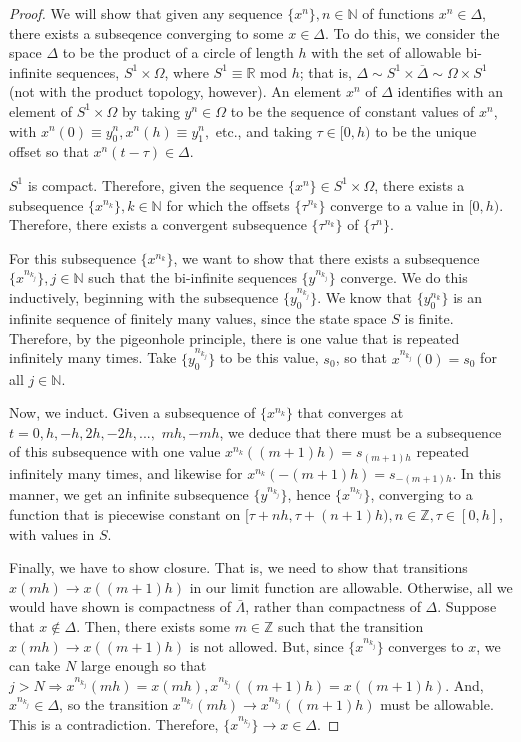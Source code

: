 \documentclass[11pt]{article}
\begin{document}
\begin{proof}
We will show that given any sequence $\{x^n\}, n \in \mathbb{N}$ of functions $x^n \in \Delta$, there exists a subseqence converging to some $x \in \Delta$.  To do this, we consider the space $\Delta$ to be the product of a circle of length $h$ with the set of allowable bi-infinite sequences, $S^1 \times \Omega$, where $S^1 \equiv \mathbb{R}$ mod $h$; that is, $\Delta \sim S^1\times\overline{\Delta} \sim \Omega\times S^1$ (not with the product topology, however).  An element $x^n$ of $\Delta$ identifies with an element of $S^1 \times \Omega$ by taking $y^n \in \Omega$ to be the sequence of constant values of $x^n$, with $x^n(0) \equiv y^n_0, x^n(h) \equiv y^n_1,$ etc., and taking $\tau \in [0,h)$ to be the unique offset so that $x^n(t-\tau) \in \Delta$.

$S^1$ is compact.  Therefore, given the sequence $\{x^n\} \in S^1 \times \Omega$, there exists a subsequence $\{x^{n_k}\}, k \in \mathbb{N}$ for which the offsets $\{\tau^{n_k}\}$ converge to a value in $[0,h)$.  Therefore, there exists a convergent subsequence $\{\tau^{n_k}\}$ of $\{\tau^n\}$.

For this subsequence $\{x^{n_k}\}$, we want to show that there exists a subsequence $\{x^{n_{k_j}}\}, j \in \mathbb{N}$ such that the bi-infinite sequences $\{y^{n_{k_j}}\}$ converge.  We do this inductively, beginning with the subsequence $\{y^{n_{k_j}}_0\}$.  We know that  $\{y^{n_k}_0\}$ is an infinite sequence of finitely many values, since the state space $S$ is finite.  Therefore, by the pigeonhole principle, there is one value that is repeated infinitely many times.  Take $\{y^{n_{k_j}}_0\}$ to be this value, $s_0$, so that $x^{n_{k_j}}(0) = s_0$ for all $j \in \mathbb{N}$.

Now, we induct.  Given a subsequence of $\{x^{n_k}\}$ that converges at $t = 0, h, -h, 2h, -2h, ..., $ $mh, -mh$, we deduce that there must be a subsequence of this subsequence with one value $x^{n_k}((m+1)h) = s_{(m+1)h}$ repeated infinitely many times, and likewise for $x^{n_k}(-(m+1)h) = s_{-(m+1)h}$.  In this manner, we get an infinite subsequence $\{y^{n_{k_j}}\}$, hence $\{x^{n_{k_j}}\}$, converging to a function that is piecewise constant on $[\tau + nh, \tau + (n+1)h), n \in \mathbb{Z}, \tau \in [0,h]$, with values in $S$.



Finally, we have to show closure.  That is, we need to show that transitions $x(mh) \rightarrow x((m+1)h)$ in our limit function are allowable.  Otherwise, all we would have shown is compactness of $\bar{\Lambda}$, rather than compactness of $\Delta$.  Suppose that $x \notin \Delta$.  Then, there exists some $m \in \mathbb{Z}$ such that the transition $x(mh) \rightarrow x((m+1)h)$ is not allowed.  But, since $\{x^{n_{k_j}}\}$ converges to $x$, we can take $N$ large enough so that $j > N \Rightarrow x^{n_{k_j}}(mh) = x(mh), x^{n_{k_j}}((m+1)h) = x((m+1)h)$.  And, $x^{n_{k_j}} \in \Delta$, so the transition $x^{n_{k_j}}(mh) \rightarrow x^{n_{k_j}}((m+1)h)$ must be allowable.  This is a contradiction.  Therefore, $\{x^{n_{k_j}}\} \rightarrow x \in \Delta$.

\end{proof}
\end{document}
